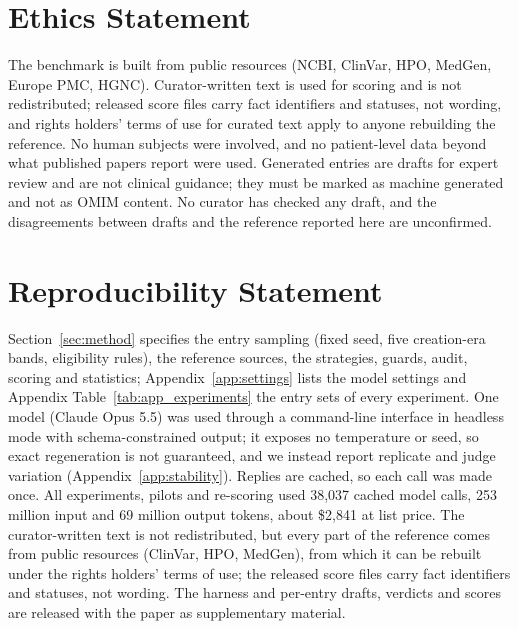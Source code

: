 \documentclass{article} %
\begin{document}
\section*{Ethics Statement}
The benchmark is built from public resources (NCBI, ClinVar, HPO, MedGen, Europe PMC, HGNC). Curator-written text is used for scoring and is not redistributed; released score files carry fact identifiers and statuses, not wording, and rights holders' terms of use for curated text apply to anyone rebuilding the reference. No human subjects were involved, and no patient-level data beyond what published papers report were used. Generated entries are drafts for expert review and are not clinical guidance; they must be marked as machine generated and not as OMIM content. No curator has checked any draft, and the disagreements between drafts and the reference reported here are unconfirmed.

\section*{Reproducibility Statement}
Section~\ref{sec:method} specifies the entry sampling (fixed seed, five creation-era bands, eligibility rules), the reference sources, the strategies, guards, audit, scoring and statistics; Appendix~\ref{app:settings} lists the model settings and Appendix Table~\ref{tab:app_experiments} the entry sets of every experiment. One model (Claude Opus 5.5) was used through a command-line interface in headless mode with schema-constrained output; it exposes no temperature or seed, so exact regeneration is not guaranteed, and we instead report replicate and judge variation (Appendix~\ref{app:stability}). Replies are cached, so each call was made once. All experiments, pilots and re-scoring used 38,037 cached model calls, 253 million input and 69 million output tokens, about \$2,841 at list price. The curator-written text is not redistributed, but every part of the reference comes from public resources (ClinVar, HPO, MedGen), from which it can be rebuilt under the rights holders' terms of use; the released score files carry fact identifiers and statuses, not wording. The harness and per-entry drafts, verdicts and scores are released with the paper as supplementary material.




\clearpage
\appendix
\FloatBarrier
\end{document}
